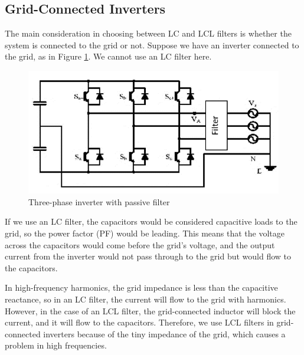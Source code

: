 \documentclass[12pt,a4paper]{book}
\begin{document}
\subsection{Grid-Connected Inverters}
The main consideration in choosing between LC and LCL filters is whether the system is connected to the grid or not. Suppose we have an inverter connected to the grid, as in Figure \ref{fig:image19}. We cannot use an LC filter here.

\begin{figure}[h]
  \centering
  \includegraphics[width=15cm]{image19.png}
  \caption{Three-phase inverter with passive filter}
  \label{fig:image19}
\end{figure}

If we use an LC filter, the capacitors would be considered capacitive loads to the grid, so the power factor (PF) would be leading. This means that the voltage across the capacitors would come before the grid's voltage, and the output current from the inverter would not pass through to the grid but would flow to the capacitors.

In high-frequency harmonics, the grid impedance is less than the capacitive reactance, so in an LC filter, the current will flow to the grid with harmonics. However, in the case of an LCL filter, the grid-connected inductor will block the current, and it will flow to the capacitors. Therefore, we use LCL filters in grid-connected inverters because of the tiny impedance of the grid, which causes a problem in high frequencies.
\end{document}
